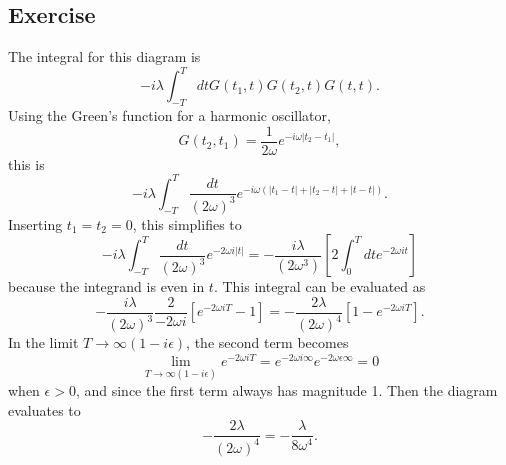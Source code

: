 \subsection{Exercise}
The integral for this diagram is
\begin{equation}
    -i\lambda \int_{-T}^TdtG(t_1,t)G(t_2,t)G(t,t).
\end{equation}
Using the Green's function for a harmonic oscillator, 
\begin{equation}
    G(t_2,t_1)=\frac 1 {2\omega} e^{-i\omega |t_2-t_1|},
\end{equation}
this is 
\begin{equation}
    -i\lambda\int_{-T}^T \frac {dt}{(2\omega)^3}e^{-i\omega(|t_1-t|+|t_2-t|+|t-t|)}. 
\end{equation}
Inserting $t_1=t_2=0$, this simplifies to 
\begin{equation}
     -i\lambda \int_{-T}^T \frac{dt}{(2\omega)^3} e^{-2\omega i |t|}=-\frac{i\lambda}{(2\omega^3)}\left[2\int_0^T dt e^{-2\omega i t}\right]
\end{equation}
because the integrand is even in $t$. This integral can be evaluated as
\begin{equation}
    -\frac{i\lambda}{(2\omega)^3}\frac 2 {-2\omega i}\left[e^{-2\omega i T}-1\right]= -\frac{2\lambda}{(2\omega)^4}\left[1-e^{-2\omega i T}\right].
\end{equation}
In the limit $T \to \infty (1 - i\epsilon)$, the second term becomes
\begin{equation}
    \lim_{T \to \infty (1 - i\epsilon)}e^{-2\omega i T}=e^{-2\omega i \infty}e^{-2\omega \epsilon \infty}=0
\end{equation}
when $\epsilon>0$, and since the first term always has magnitude 1. Then the diagram evaluates to 
\begin{equation}
    -\frac{2\lambda}{(2\omega)^4}=-\frac{\lambda}{8\omega^4}.
\end{equation}
